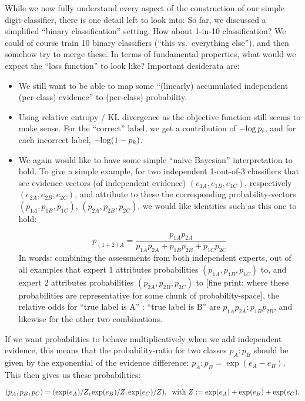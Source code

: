 \documentclass[11pt]{article}
\begin{document}
While we now fully understand every aspect of the construction of our
simple digit-classifier, there is one detail left to look into: So far,
we discussed a simplified ``binary classification'' setting. How about
1-in-10 classification? We could of course train 10 binary classifiers
(``this vs.~everything else''), and then somehow try to merge these. In
terms of fundamental properties, what would we expect the ``loss
function'' to look like? Important desiderata are:

\begin{itemize}
\item
  We still want to be able to map some ``(linearly) accumulated
  independent (per-class) evidence'' to (per-class) probability.
\item
  Using relative entropy / KL divergence as the objective function still
  seems to make sense. For the ``correct'' label, we get a contribution
  of \(-{\rm log}\, p_i\), and for each incorrect label,
  \(-{\rm log}(1-p_k)\).
\item
  We again would like to have some simple ``naive Bayesian''
  interpretation to hold. To give a simple example, for two independent
  1-out-of-3 classifiers that see evidence-vectors (of independent
  evidence) \((e_{1A}, e_{1B}, e_{1C})\), respectively
  \((e_{2A}, e_{2B}, e_{2C})\), and attribute to these the corresponding
  probability-vectors \((p_{1A}, p_{1B}, p_{1C})\),
  \((p_{2A}, p_{2B}, p_{2C})\), we would like identities such as this
  one to hold:

  \[
   p_{(1+2)A} = \frac{p_{1A}p_{2A}}{p_{1A}p_{2A}+p_{1B}p_{2B}+p_{1C}p_{2C}}
  \] In words: combining the assessments from both independent experts,
  out of all examples that expert 1 attributes probabilities
  \((p_{1A}, p_{1B}, p_{1C})\) to, and expert 2 attributes probabilities
  \((p_{2A}, p_{2B}, p_{2C})\) to {[}fine print: where these
  probabilities are representative for some chunk of
  probability-space{]}, the relative odds for ``true label is A'' :
  ``true label is B'' are \(p_{1A}p_{2A}:p_{1B}p_{2B}\), and likewise
  for the other two combinations.
\end{itemize}

If we want probabilities to behave multiplicatively when we add
independent evidence, this means that the probability-ratio for two
classes \(p_A:p_B\) should be given by the exponential of the evidence
difference: \(p_A:p_B=\exp(e_A-e_B)\). This then gives us these
probabilities:

\[
(p_A, p_B, p_C) = (\exp(e_A)/Z, \exp(e_B)/Z, \exp(e_C)/Z),\;\;{\rm with}\;Z:=\exp(e_A)+\exp(e_B)+\exp(e_C).
\]
\end{document}
